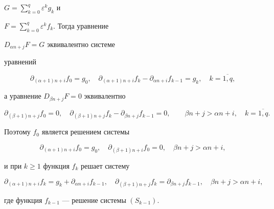 $G = \sum\limits^q_{k=0} \varepsilon^k g_k$ и


$F = \sum\limits^q_{k=0} \varepsilon^k f_k$. Тогда уравнение


$D_{\alpha n + j}F = G$ эквивалентно системе


уравнений


$$


\partial_{(\alpha + 1)n + i}f_0 = g_0, \quad


\partial_{(\alpha + 1)n + i}f_k -


\partial_{\alpha n + i}f_{k-1} = g_k, \quad


k=\overline{1,q},


$$


а уравнение $D_{\beta n + j}F = 0$ эквивалентно


$$


\partial_{(\beta + 1)n + j}f_0 = 0, \quad


\partial_{(\beta + 1)n + j}f_k -


\partial_{\beta n + j}f_{k-1} = 0, \qquad


\beta n + j > \alpha n + i, \quad k=\overline{1,q}.


$$


Поэтому $f_0$ является решением системы


\begin{equation*}


\partial_{(\alpha + 1)n + i}f_0 = g_0, \quad


\partial_{(\beta + 1)n + i}f_0 = 0,  \quad


\beta n + j > \alpha n + i,


\tag{$S_0$}


\end{equation*}


и при $k \ge 1$ функция $f_k$ решает систему


\begin{equation*}


\partial_{(\alpha + 1)n + i}f_k = g_k + \partial_{\alpha n + i}f_{k-1},


\quad


\partial_{(\beta + 1)n + j}f_k = \partial_{\beta n + j}f_{k-1},


\quad \beta n + j > \alpha n + i,


\tag{$S_k$}


\end{equation*}


где функция $f_{k-1}$ --- решение системы $(S_{k-1})$.





